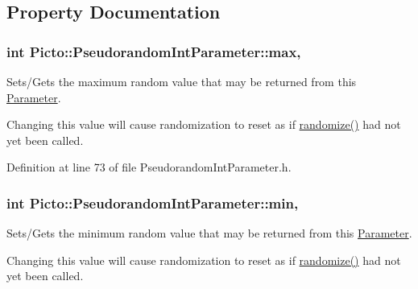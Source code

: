 \subsection{Property Documentation}
\hypertarget{class_picto_1_1_pseudorandom_int_parameter_ac996a85e786771c4d1b2881426fc4ba4}{
\subsubsection[{max}]{\setlength{\rightskip}{0pt plus 5cm}int Picto\-::\-Pseudorandom\-Int\-Parameter\-::max\hspace{0.3cm}{\ttfamily [read]}, {\ttfamily [write]}}}\label{class_picto_1_1_pseudorandom_int_parameter_ac996a85e786771c4d1b2881426fc4ba4}


Sets/\-Gets the maximum random value that may be returned from this \hyperlink{class_picto_1_1_parameter}{Parameter}. 

Changing this value will cause randomization to reset as if \hyperlink{class_picto_1_1_pseudorandom_int_parameter_a77d69b74839fc19dd17b3b01b348a2c0}{randomize()} had not yet been called. 

Definition at line 73 of file Pseudorandom\-Int\-Parameter.\-h.

\hypertarget{class_picto_1_1_pseudorandom_int_parameter_ae1b16a72b8f7da941a54efb4150e2910}{
\subsubsection[{min}]{\setlength{\rightskip}{0pt plus 5cm}int Picto\-::\-Pseudorandom\-Int\-Parameter\-::min\hspace{0.3cm}{\ttfamily [read]}, {\ttfamily [write]}}}\label{class_picto_1_1_pseudorandom_int_parameter_ae1b16a72b8f7da941a54efb4150e2910}


Sets/\-Gets the minimum random value that may be returned from this \hyperlink{class_picto_1_1_parameter}{Parameter}. 

Changing this value will cause randomization to reset as if \hyperlink{class_picto_1_1_pseudorandom_int_parameter_a77d69b74839fc19dd17b3b01b348a2c0}{randomize()} had not yet been called. 

